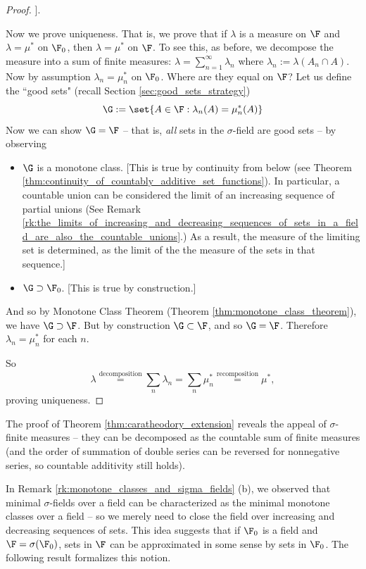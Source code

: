 \documentclass{article} %
\begin{document}
\begin{proof}
{]. }


Now we prove uniqueness.   That is, we prove that if $\lambda$ is a measure on $\F$ and $\lambda = \mu^*$ on $\F_0$, then $\lambda = \mu^*$ on $\F$.    To see this, as before, we decompose the measure into a sum of finite measures: $\lambda = \sum_{n=1}^\infty \lambda_n$ where $\lambda_n := \lambda (A_n \cap A)$.  Now by assumption $\lambda_n = \mu_n^*$ on $\F_0$.  Where are they equal on $\F$?  Let us define the ``good sets" (recall Section \ref{sec:good_sets_strategy})
\[ \G : = \set{A \in \F : \lambda_n (A) = \mu_n^* (A)} \]
Now we can show $\G = \F$ -- that is, \textit{all} sets in the $\sigma$-field are good sets -- by observing
\begin{itemize} 
\item 	 $\G$ is a monotone class.  {\footnotesize 
[This is true by continuity from below (see Theorem \ref{thm:continuity_of_countably_additive_set_functions}). In particular, a countable union can be considered the limit of an increasing sequence of partial unions (See Remark \ref{rk:the_limits_of_increasing_and_decreasing_sequences_of_sets_in_a_field_are_also_the_countable_unions}.) As a result, the measure of the limiting set is determined, as the limit of the the measure of the sets in that sequence.] }
\item $\G \supset \F_0$. {\footnotesize 
[This is true by construction.] }
\end{itemize} 
And so by Monotone Class Theorem (Theorem \ref{thm:monotone_class_theorem}), we have $\G \supset \F$.  But by construction $\G \subset \F$, and so $\G = \F$.  Therefore $\lambda_n = \mu_n^*$ for each $n$.  

So 
\[ \lambda \stackrel{\text{decomposition}}{=} \sum_n \lambda_n = \sum_n \mu_n^* \stackrel{\text{recomposition}}{=} \mu^*, \] proving uniqueness.
\end{proof}


\begin{remark}
The proof of Theorem \ref{thm:caratheodory_extension} reveals the appeal of $\sigma$-finite measures -- they can be decomposed as the countable sum of finite measures (and the order of summation of double series can be reversed for nonnegative series, so countable additivity still holds). 
\end{remark}


In Remark \ref{rk:monotone_classes_and_sigma_fields} (b), we observed that minimal $\sigma$-fields over a field can be characterized as the minimal monotone classes over a field -- so we merely need to close the field over increasing and decreasing sequences of sets.   This idea suggests that if $\F_0$ is a field and $\F = \sigma(\F_0)$, sets in $\F$ can be approximated in some sense by sets in $\F_0$.  The following result formalizes this notion. 
\end{document}
